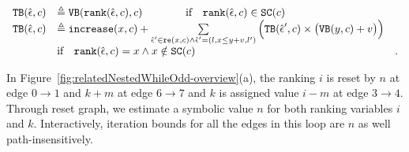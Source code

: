 \begin{defn}
{%
\[ 
\begin{array}{lll}
 {\ensuremath{\mathtt{TB}}}(\hat{\mathtt{\epsilon}{}}, c) 
 & \triangleq {\ensuremath{\mathtt{VB}}}(\mathtt{rank}(\hat{\mathtt{\epsilon}{}}, c), c) \qquad \qquad \text{if} \quad \mathtt{rank}(\hat{\mathtt{\epsilon}{}}, c) \in \mathtt{SC}(c) & \\
 {\mathtt{TB}}(\hat{\mathtt{\epsilon}{}}, c) 
 & \triangleq \mathtt{increase}(x, c) 
 + 
 \sum\limits_{\hat{\mathtt{\epsilon}{}}' \in \mathtt{re}(x, c) \land \hat{\mathtt{\epsilon}{}}' = (l, x \leq y + v, l') }
 \Big( {\mathtt{TB}}(\hat{\mathtt{\epsilon}{}}', c) \times \big( {\mathtt{VB}}(y, c) + v \big) \Big)
 & \\
 & \text{if} \quad \mathtt{rank}(\hat{\mathtt{\epsilon}{}}, c) = x \land x \notin \mathtt{SC}(c) &.
\end{array}
 \]
}
\end{defn}
In Figure~\ref{fig:relatedNestedWhileOdd-overview}(a), the ranking $i$ is reset by $n$ at edge $0 \to 1$ and 
$k + m$ at edge $6 \to 7$ and $k$ is assigned value $i - m$ at edge $3 \to 4$. Through reset graph, 
we estimate a symbolic value $n$ for both ranking variables $i$ and $k$.
Interactively, iteration bounds for all the edges in this loop are $n$ as well path-insensitively.